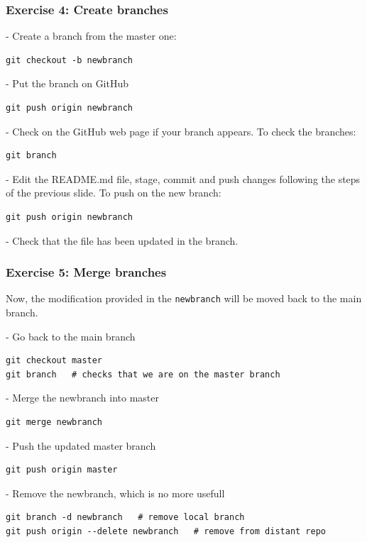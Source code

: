\documentclass[svgnames]{beamer}
\begin{document}
\begin{frame}[fragile]
\frametitle{Exercise 4: Create branches}

- Create a branch from the master one:

\begin{lstlisting}
git checkout -b newbranch
\end{lstlisting}
- Put the branch on GitHub

\begin{lstlisting}
git push origin newbranch
\end{lstlisting}

- Check on the GitHub web page if your branch appears. To check the branches:
\begin{lstlisting}
git branch
\end{lstlisting}

- Edit the README.md file, stage, commit and push changes following the steps of the previous slide. To push on the new branch:
\begin{lstlisting}
git push origin newbranch
\end{lstlisting}

- Check that the file has been updated in the branch.

\end{frame}

\begin{frame}[fragile]
\frametitle{Exercise 5: Merge branches}

Now, the modification provided in the \verb+newbranch+ will be moved back to the main branch.

- Go back to the main branch
\begin{lstlisting}
git checkout master
git branch   # checks that we are on the master branch
\end{lstlisting}

- Merge the newbranch into master
\begin{lstlisting}
git merge newbranch
\end{lstlisting}

- Push the updated master branch
\begin{lstlisting}
git push origin master
\end{lstlisting}

- Remove the newbranch, which is no more usefull
\begin{lstlisting}
git branch -d newbranch   # remove local branch
git push origin --delete newbranch   # remove from distant repo
\end{lstlisting}

\end{frame}
\end{document}
